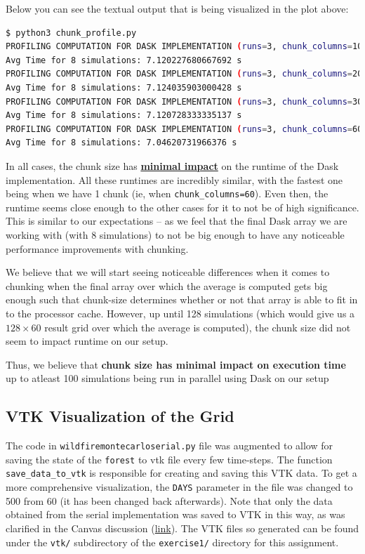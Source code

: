 \documentclass[a4paper,12pt]{article}
\begin{document}
Below you can see the textual output that is being visualized in the plot above:
\begin{lstlisting}[language=bash,basicstyle=\tiny\ttfamily]
$ python3 chunk_profile.py
PROFILING COMPUTATION FOR DASK IMPLEMENTATION (runs=3, chunk_columns=10)
Avg Time for 8 simulations: 7.120227680667692 s 
PROFILING COMPUTATION FOR DASK IMPLEMENTATION (runs=3, chunk_columns=20)
Avg Time for 8 simulations: 7.124035903000428 s 
PROFILING COMPUTATION FOR DASK IMPLEMENTATION (runs=3, chunk_columns=30)
Avg Time for 8 simulations: 7.120728333335137 s 
PROFILING COMPUTATION FOR DASK IMPLEMENTATION (runs=3, chunk_columns=60)
Avg Time for 8 simulations: 7.04620731966376 s
\end{lstlisting}

In all cases, the chunk size has \textbf{\underline{minimal impact}} on the runtime of the Dask implementation. All these runtimes are incredibly similar, with the fastest one being when we have 1 chunk (ie, when \verb|chunk_columns=60|). Even then, the runtime seems close enough to the other cases for it to not be of high significance. This is similar to our expectations -- as we feel that the final Dask array we are working with (with 8 simulations) to not be big enough to have any noticeable performance improvements with chunking. 

We believe that we will start seeing noticeable differences when it comes to chunking when the final array over which the average is computed gets big enough such that chunk-size determines whether or not that array is able to fit in to the processor cache. However, up until 128 simulations (which would give us a $128 \times 60$ result grid over which the average is computed), the chunk size did not seem to impact runtime on our setup. 

Thus, we believe that \textbf{chunk size has minimal impact on execution time} up to atleast 100 simulations being run in parallel using Dask on our setup

\subsection{VTK Visualization of the Grid}
The code in \verb|wildfiremontecarloserial.py| file was augmented to allow for saving the state of the \verb|forest| to vtk file every few time-steps. The function \verb|save_data_to_vtk| is responsible for creating and saving this VTK data. To get a more comprehensive visualization, the \verb|DAYS| parameter in the file was changed to 500 from 60 (it has been changed back afterwards). Note that only the data obtained from the serial implementation was saved to VTK in this way, as was clarified in the Canvas discussion (\href{https://canvas.kth.se/courses/52247/discussion_topics/453192}{link}). The VTK files so generated can be found under the \verb|vtk/| subdirectory of the \verb|exercise1/| directory for this assignment.
\end{document}
